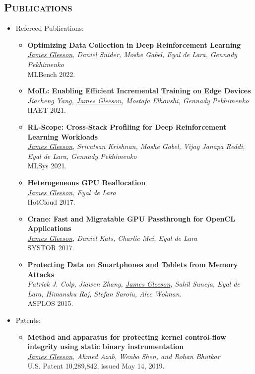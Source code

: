 \documentclass[letterpaper,11pt]{article}
\newcommand{\BulletZeroLeftMargin}{1.5em}
\newcommand{\heading}[1]{%
    \textsc{\textbf{#1}}
}
\newcommand*\resheading[1]{\subsection{\heading{#1}}\vspace{0.3em}\nopagebreak[4]}
\newcommand{\resitem}[1]{\item #1 \vspace{-2pt}}
\newcommand{\ressubheadingnodate}[1]{#1:}
\begin{document}
\resheading{Publications}
\begin{itemize}[leftmargin=\BulletZeroLeftMargin]
\item

	\ressubheadingnodate{Refereed Publications}
    \begin{itemize}[leftmargin=\BulletZeroLeftMargin]
        \resitem{
            \textbf{Optimizing Data Collection in Deep Reinforcement Learning} \\
            \textit{\underline{James Gleeson}, Daniel Snider, Moshe Gabel, Eyal de Lara, Gennady Pekhimenko} \\
            MLBench 2022.
        }
        \resitem{
            \textbf{MoIL: Enabling Efficient Incremental Training on Edge Devices} \\
            \textit{Jiacheng Yang, \underline{James Gleeson}, Mostafa Elhoushi, Gennady Pekhimenko} \\
            HAET 2021.
        }
        \resitem{
            \textbf{RL-Scope: Cross-Stack Profiling for Deep Reinforcement Learning Workloads} \\
            \textit{\underline{James Gleeson}, Srivatsan Krishnan, Moshe Gabel, Vijay Janapa Reddi, Eyal de Lara, Gennady Pekhimenko} \\
            MLSys 2021.
        }
        \resitem{
            \textbf{Heterogeneous GPU Reallocation} \\
            \textit{\underline{James Gleeson}, Eyal de Lara} \\
            HotCloud 2017.
        }
        \resitem{
            \textbf{Crane: Fast and Migratable GPU Passthrough for OpenCL Applications} \\
            \textit{\underline{James Gleeson}, Daniel Kats, Charlie Mei, Eyal de Lara} \\
            SYSTOR 2017.
        }
		\resitem{
            \textbf{Protecting Data on Smartphones and Tablets from Memory Attacks} \\
            \textit{Patrick J. Colp, Jiawen Zhang, \underline{James Gleeson}, Sahil Suneja, Eyal de Lara, Himanshu Raj, Stefan Saroiu, Alec Wolman.} \\
            ASPLOS 2015.
        }
	\end{itemize}
    \item
	\ressubheadingnodate{Patents}
    \begin{itemize}[leftmargin=\BulletZeroLeftMargin]
        \resitem{
            \textbf{Method and apparatus for protecting kernel control-flow integrity using static binary instrumentation} \\
            \textit{\underline{James Gleeson}, Ahmed Azab, Wenbo Shen, and Rohan Bhutkar} \\
            U.S. Patent 10,289,842, issued May 14, 2019.
        }
	\end{itemize}

\end{itemize}
\end{document}
